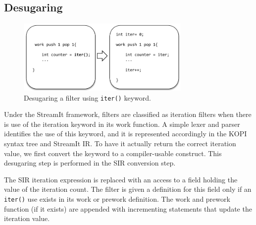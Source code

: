 \subsection{Desugaring}

%
%
%
%
%
%
%
%
%
%


\begin{figure}[t!]
\centering
\includegraphics[width=3.3in]{figures/desugaring_filters.pdf}
\caption{Desugaring a filter using \texttt{iter()} keyword.\protect\label{fig:desugar}}
\end{figure}


Under the StreamIt framework, filters are classified as iteration filters when there is use of the iteration keyword in its work function.  A simple lexer and parser identifies the use of this keyword, and it is represented accordingly in the KOPI syntax tree and StreamIt IR.  To have it actually return the correct iteration value, we first convert the keyword to a compiler-usable construct.  This desugaring step is performed in the SIR conversion step.

The SIR iteration expression is replaced with an access to a field holding the value of the iteration count.  The filter is given a definition for this field only if an {\tt iter()} use exists in its work or prework definition.  The work and prework function (if it exists) are appended with incrementing statements that update the iteration value.

